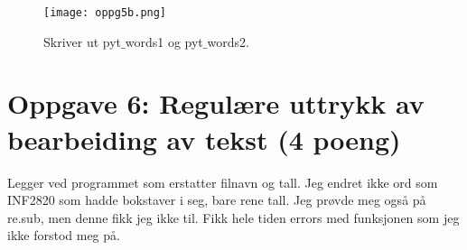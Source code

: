 \documentclass[a4paper, 12pt,]{article}             %
\begin{document}
\begin{figure}[tbh]
    \centering
    \texttt{[image: oppg5b.png]}
    \caption{Skriver ut pyt$\_$words1 og pyt$\_$words2.}
    \label{fig:awesome_image3}
  \end{figure}

  \section*{Oppgave 6: Regulære uttrykk av bearbeiding av tekst (4 poeng)}

  Legger ved programmet som erstatter filnavn og tall. Jeg endret ikke ord som INF2820 som hadde bokstaver i seg, bare rene tall. Jeg prøvde meg også på re.sub, men denne fikk jeg ikke til. Fikk hele tiden errors med funksjonen som jeg ikke forstod meg på.
\end{document}
